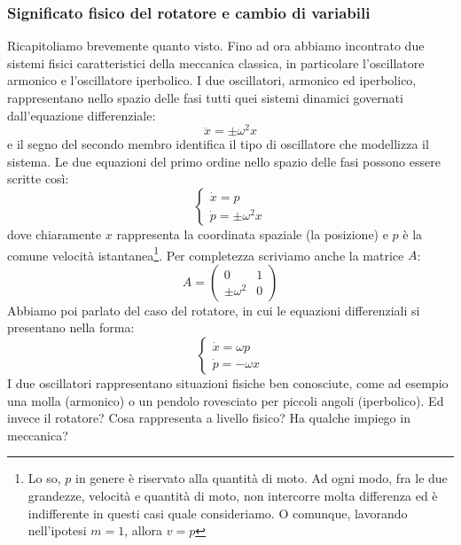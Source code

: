 \documentclass[a4paper,openany]{article}
\begin{document}
	\subsubsection{Significato fisico del rotatore e cambio di variabili}
	Ricapitoliamo brevemente quanto visto.
	Fino ad ora abbiamo incontrato due sistemi fisici caratteristici della meccanica classica, in particolare l'oscillatore armonico e l'oscillatore iperbolico. I due oscillatori, armonico ed iperbolico, rappresentano nello spazio delle fasi tutti quei sistemi dinamici governati dall'equazione differenziale:
	$$
	\ddot{x} = \pm \omega^{2} x
	$$
	e il segno del secondo membro identifica il tipo di oscillatore che modellizza il sistema. Le due equazioni del primo ordine nello spazio delle fasi possono essere scritte così:
	\begin{equation}
		\begin{cases}
			\dot{x} = p \\
			\dot{p} = \pm \omega^{2} x
		\end{cases}
	\end{equation}
	dove chiaramente $x$ rappresenta la coordinata spaziale (la posizione) e $p$ è la comune velocità istantanea\footnote{Lo so, $p$ in genere è riservato alla quantità di moto. Ad ogni modo, fra le due grandezze, velocità e quantità di moto, non intercorre molta differenza ed è indifferente in questi casi quale consideriamo. O comunque, lavorando nell'ipotesi $m=1$, allora $v = p$}. Per completezza scriviamo anche la matrice $A$:
	\begin{equation}
		A =
		\begin{pmatrix}
			0 & 1 \\
			\pm \omega^{2} & 0
		\end{pmatrix}
	\end{equation}
	Abbiamo poi parlato del caso del rotatore, in cui le equazioni differenziali si presentano nella forma:
	\begin{equation}
		\begin{cases}
			\dot{x} = \omega p \\
			\dot{p} = -\omega x
		\end{cases}
		\label{EqRotat}
	\end{equation}
	I due oscillatori rappresentano situazioni fisiche ben conosciute, come ad esempio una molla (armonico) o un pendolo rovesciato per piccoli angoli (iperbolico). Ed invece il rotatore? Cosa rappresenta a livello fisico? Ha qualche impiego in meccanica?
	
\end{document}
